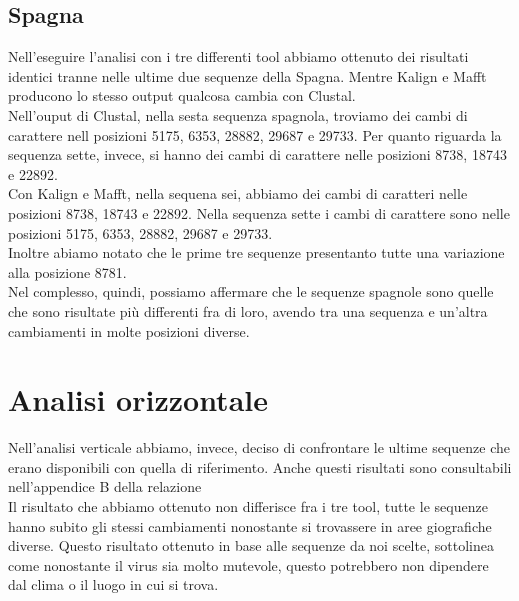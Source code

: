 \documentclass[a4paper,10pt]{article}
\begin{document}
\subsection{Spagna}
Nell'eseguire l'analisi con i tre differenti tool abbiamo ottenuto dei risultati identici tranne nelle ultime due sequenze della Spagna. Mentre Kalign e Mafft producono lo stesso output qualcosa cambia con Clustal.\\
Nell'ouput di Clustal, nella sesta sequenza spagnola, troviamo dei cambi di carattere nell posizioni 5175, 6353, 28882, 29687 e 29733. Per quanto riguarda la sequenza sette, invece, si hanno dei cambi di carattere nelle posizioni 8738, 18743 e 22892.\\
Con Kalign e Mafft, nella sequena sei, abbiamo dei cambi di caratteri nelle posizioni 8738, 18743 e 22892. Nella sequenza sette i cambi di carattere sono nelle posizioni 5175, 6353, 28882, 29687 e 29733.\\
Inoltre abiamo notato che le prime tre sequenze presentanto tutte una variazione alla posizione 8781.\\
Nel complesso, quindi, possiamo affermare che le sequenze spagnole sono quelle che sono risultate più differenti fra di loro, avendo tra una sequenza e un'altra cambiamenti in molte posizioni diverse.\\ 
\newpage

\section{Analisi orizzontale}
Nell'analisi verticale abbiamo, invece, deciso di confrontare le ultime sequenze che erano disponibili con quella di riferimento. Anche questi risultati sono consultabili nell'appendice B della relazione\\
Il risultato che abbiamo ottenuto  non differisce fra i tre tool, tutte le sequenze hanno subito gli stessi cambiamenti nonostante si trovassere in aree giografiche diverse. Questo risultato ottenuto in base alle sequenze da noi scelte, sottolinea come nonostante il virus sia molto mutevole, questo potrebbero non dipendere dal clima o il luogo in cui si trova.


\newpage
\end{document}
